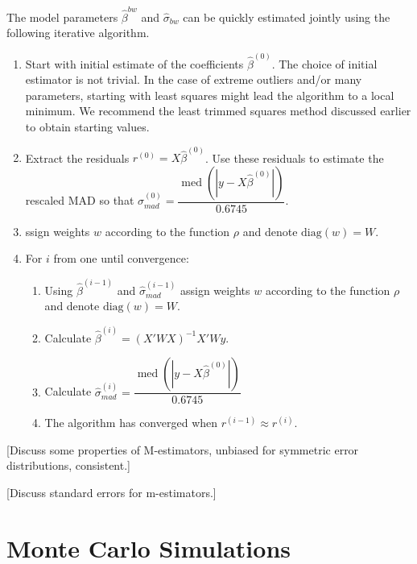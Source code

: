 \documentclass[12pt]{article}
\DeclareMathOperator{\med}{med}
\begin{document}
The model parameters $\hat{\beta}^{bw}$ and $\hat{\sigma}_{bw}$ can be quickly estimated jointly using the following iterative algorithm.
\begin{enumerate}
\item Start with initial estimate of the coefficients $\hat{\beta}^{(0)}$. The choice of initial estimator is not trivial. In the case of extreme outliers and/or many parameters, starting with least squares might lead the algorithm to a local minimum. We recommend the least trimmed squares method discussed earlier to obtain starting values.
\item Extract the residuals $r^{(0)} = X\hat{\beta}^{(0)}$. Use these residuals to estimate the rescaled MAD so that $\hat{\sigma}^{(0)}_{mad} = \dfrac{\med\left( |y - X\hat{\beta}^{(0)}|\right)}{0.6745}$.
\item ssign weights $w$ according to the function $\rho$ and denote $\text{diag}(w) = W$.
\item For $i$ from one until convergence:
	\begin{enumerate}
	\item Using $\hat{\beta}^{(i-1)}$ and $\hat{\sigma}^{(i-1)}_{mad}$ assign weights $w$ according to the function $\rho$ and denote $\text{diag}(w) = W$.
	\item Calculate $\hat{\beta}^{(i)} = (X'WX)^{-1}X'Wy$.
	\item Calculate $\hat{\sigma}^{(i)}_{mad} = \dfrac{\med\left( |y - X\hat{\beta}^{(0)}|\right)}{0.6745}$
	\item The algorithm has converged when $r^{(i-1)} \approx r^{(i)}$.
	\end{enumerate}
\end{enumerate}

[Discuss some properties of M-estimators, unbiased for symmetric error distributions, consistent.]

[Discuss standard errors for m-estimators.]

\section*{Monte Carlo Simulations}
\end{document}
